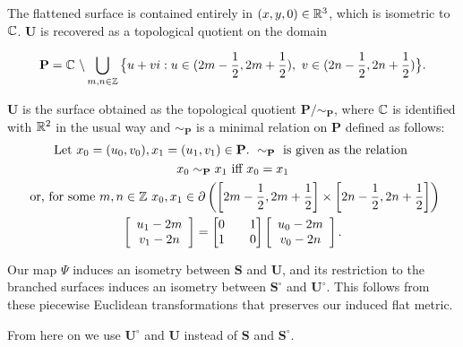 \documentclass[]{article}
\def\bU{\mathbf{U}} \def\btU{\tilde{\bU}} \def\bUs{\bU^\circ}
\begin{document}
The flattened surface is contained entirely in $(x,y,0)\in\mathbb{R}^3$, which is isometric to $\mathbb{C}$. $\bU$ is recovered as a topological quotient on the domain

\begin{equation}
\label{eq:P}
\mathbf{P} = \mathbb{C}\text{ }\backslash\bigcup_{m,n \in {\mathbb Z}} \big{\{} u+vi:u\in(2m-\frac{1}{2},2m+\frac{1}{2}),\text{ } v\in(2n-\frac{1}{2},2n+\frac{1}{2})\big{\}}.
\end{equation}

\begin{Def} $\mathbf U$ is the surface obtained as the topological quotient $\mathbf{P}/\sim_{\mathbf{P}}$, where $\mathbb{C}$ is identified with $\mathbb{R}^2$ in the usual way and $\sim_{\mathbf{P}}$ is a minimal relation on $\mathbf{P}$ defined as follows:
\begin{gather*}
\text{Let } x_{0}=(u_{0},v_{0}),x_{1}=(u_{1},v_{1}) \in \mathbf{P}.  \text{ }\sim_{\mathbf{P}} \text { is given as the relation }\\ x_{0}\sim_{\mathbf{P}}x_{1}  \text{ iff } x_{0}=x_{1}
 \\\text{ or, for some }m,n\in\mathbb{Z}~x_{0},x_{1} \in {\partial} \left( \left[2m-\frac{1}{2},2m+\frac{1}{2}\right] \times \left[2n-\frac{1}{2},2n+\frac{1}{2}\right] \right)\\
  \left[\begin{array}{c}
u_{1} -2m
\\v_{1}-2n
\end{array}\right] = \left[\begin{matrix}
0 && 1\\
1 && 0
\end{matrix}\right]
\left[ \begin{array}{c}u_{0}-2m\\
v_{0}-2n
\end{array}\right]
.\end{gather*}\end{Def}

\begin{rem}
Our map $\Psi$ induces an isometry between $\mathbf{S}$ and $\bU$, and its restriction to the branched surfaces induces an isometry between $\mathbf{S}^\circ$ and $\bUs$. This follows from these piecewise Euclidean transformations that preserves our induced flat metric.
\end{rem}
From here on we use $\bUs$ and $\bU$ instead of $\mathbf{S}$ and $\mathbf{S}^\circ$.
\end{document}
